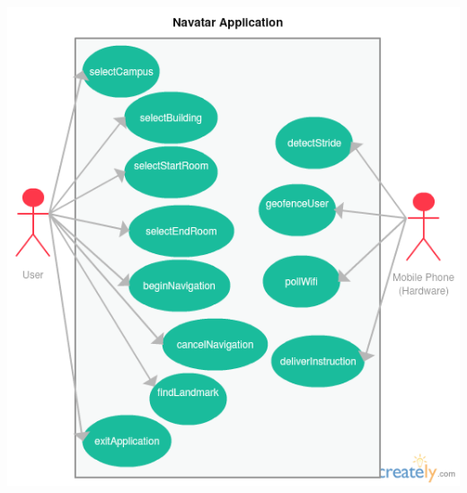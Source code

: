 \documentclass{scrreprt}
\begin{document}
	\includegraphics[width=\textwidth]{ucd.png}
\end{document}
